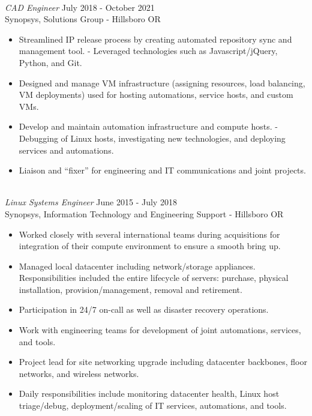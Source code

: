 \documentclass[line,margin]{res}
\begin{document}
\begin{resume}
\begin{adjustwidth}{-115pt}{0pt}
\begin{itemize}
		\end{itemize}
	\hfill\\
	{\sl CAD Engineer}
		\hfill July 2018 - October 2021\\
		Synopsys, Solutions Group - Hillsboro OR
		\begin{itemize}
			\item Streamlined IP release process by creating automated repository sync and management tool.
				\subitem - Leveraged technologies such as Javascript/jQuery, Python, and Git. 
			\item Designed and manage VM infrastructure (assigning resources, load balancing, VM deployments) used for hosting automations, service hosts, and custom VMs.
			\item Develop and maintain automation infrastructure and compute hosts.
				\subitem - Debugging of Linux hosts, investigating new technologies, and deploying services and automations.
			\item Liaison and “fixer” for engineering and IT communications and joint projects.
		\end{itemize}
	\hfill\\
	{\sl Linux Systems Engineer}
		\hfill June 2015 - July 2018\\
		Synopsys, Information Technology and Engineering Support - Hillsboro OR
		\begin{itemize}
			\item Worked closely with several international teams during acquisitions for integration of their compute environment to ensure a smooth bring up.
			\item Managed local datacenter including network/storage appliances. Responsibilities included the entire lifecycle of servers: purchase, physical installation, provision/management, removal and retirement.
			\item Participation in 24/7 on-call as well as disaster recovery operations.
			\item Work with engineering teams for development of joint automations, services, and tools.
			\item Project lead for site networking upgrade including datacenter backbones, floor networks, and wireless networks.
			\item Daily responsibilities include monitoring datacenter health, Linux host triage/debug, deployment/scaling of IT services, automations, and tools.
		\end{itemize}


\end{adjustwidth}
\end{resume}
\end{document}
